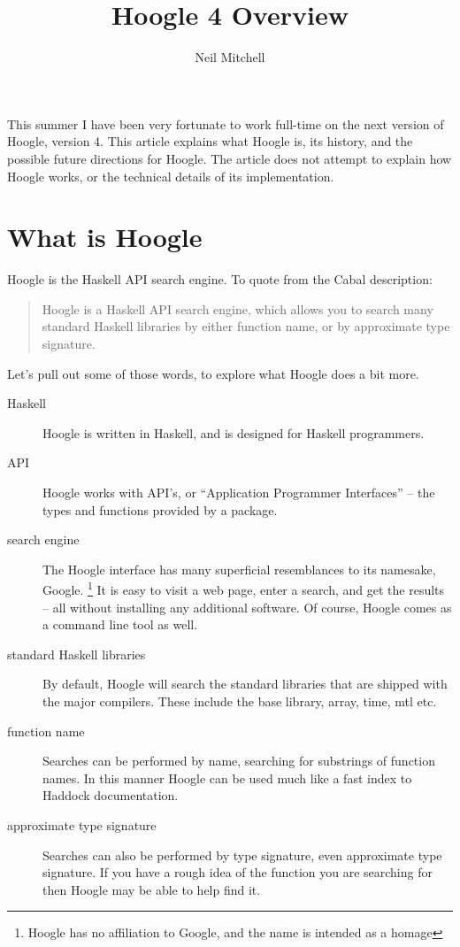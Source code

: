 \documentclass{tmr}
\title{Hoogle 4 Overview}
\author{Neil Mitchell\email{ndmitchell@gmail.com}}
\begin{document}
\begin{introduction}
This summer I have been very fortunate to work full-time on the next version of Hoogle, version 4. This article explains what Hoogle is, its history, and the possible future directions for Hoogle. The article does not attempt to explain how Hoogle works, or the technical details of its implementation.
\end{introduction}

\section{What is Hoogle}

Hoogle is the Haskell API search engine. To quote from the Cabal description:

\begin{quote}
Hoogle is a Haskell API search engine, which allows you to search many standard Haskell libraries by either function name, or by approximate type signature.
\end{quote}

Let's pull out some of those words, to explore what Hoogle does a bit more.

\begin{description}
\item[Haskell] Hoogle is written in Haskell, and is designed for Haskell programmers.
\item[API] Hoogle works with API's, or ``Application Programmer Interfaces'' -- the types and functions provided by a package.
\item[search engine] The Hoogle interface has many superficial resemblances to its namesake, Google. \footnote{Hoogle has no affiliation to Google, and the name is intended as a homage} It is easy to visit a web page, enter a search, and get the results -- all without installing any additional software. Of course, Hoogle comes as a command line tool as well.
\item[standard Haskell libraries] By default, Hoogle will search the standard libraries that are shipped with the major compilers. These include the base library, array, time, mtl etc.
\item[function name] Searches can be performed by name, searching for substrings of function names. In this manner Hoogle can be used much like a fast index to Haddock documentation.
\item[approximate type signature] Searches can also be performed by type signature, even approximate type signature. If you have a rough idea of the function you are searching for then Hoogle may be able to help find it.
\end{description}
\end{document}
